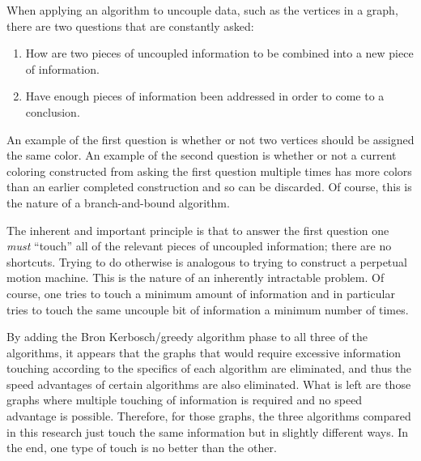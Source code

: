 When applying an algorithm to uncouple data, such as the vertices in a graph, there are two questions that are
constantly asked:
\begin{enumerate}
\item How are two pieces of uncoupled information to be combined into a new piece of information.
\item Have enough pieces of information been addressed in order to come to a conclusion.
\end{enumerate}
An example of the first question is whether or not two vertices should be assigned the same color.  An example of
the second question is whether or not a current coloring constructed from asking the first question multiple times
has more colors than an earlier completed construction and so can be discarded.  Of course, this is the nature of a
branch-and-bound algorithm.

The inherent and important principle is that to answer the first question one \emph{must} ``touch'' all of the
relevant pieces of uncoupled information; there are no shortcuts.  Trying to do otherwise is analogous to trying to
construct a perpetual motion machine.  This is the nature of an inherently intractable problem.  Of course, one
tries to touch a minimum amount of information and in particular tries to touch the same uncouple bit of information
a minimum number of times.

By adding the Bron Kerbosch/greedy algorithm phase to all three of the algorithms, it appears that the graphs that
would require excessive information touching according to the specifics of each algorithm are eliminated, and thus
the speed advantages of certain algorithms are also eliminated.  What is left are those graphs where multiple
touching of information is required and no speed advantage is possible.  Therefore, for those graphs, the three
algorithms compared in this research just touch the same information but in slightly different ways.  In the end,
one type of touch is no better than the other.
